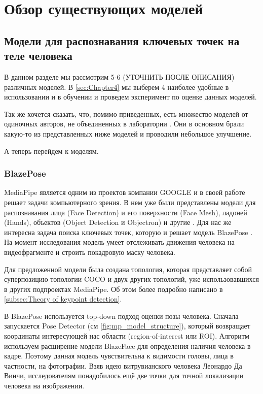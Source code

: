 \section{Обзор существующих моделей}
\label{sec:Chapter2} 

\subsection{Модели для распознавания ключевых точек на теле человека}

В данном разделе мы рассмотрим 5-6 (УТОЧНИТЬ ПОСЛЕ ОПИСАНИЯ) различных моделей. В \autoref{sec:Chapter4} мы выберем 4 наиболее удобные в использовании и в обучении и проведем эксперимент по оценке данных моделей.

Так же хочется сказать, что, помимо приведенных, есть множество моделей от одиночных авторов, не объединенных в лаборатории \cite{pet_recognition, pet_classification}. Они в основном брали какую-то из представленных ниже моделей и проводили небольшое улучшение.

А теперь перейдем к моделям.

\subsubsection{BlazePose}

MediaPipe является одним из проектов компании GOOGLE и в своей работе решает задачи компьютерного зрения. В нем уже были представлены модели для распознавания лица (Face Detection) и его поверхности (Face Mesh), ладоней (Hands), объектов (Object Detection и Objectron) и другие \cite{mediapipe}. Для нас же интересна задача поиска ключевых точек, которую и решает модель BlazePose \cite{BlazePose}. На момент исследования модель умеет отслеживать движения человека на видеофрагменте и строить покадровую маску человека.

Для предложенной модели была создана топология, которая представляет собой суперпозицию топологии COCO и двух других топологий, уже использовавшихся в других подпроектах MediaPipe. Об этом более подробно написано в \autoref{subsec:Theory of keypoint detection}.

\hfill \break
В BlazePose используется top-down подход оценки позы человека. Сначала запускается Pose Detector (см \autoref{fig:mp_model_structure}), который возвращает координаты интересующей нас области (region-of-interest или ROI). Алгоритм используем расширение модели BlazeFace для определения наличия человека в кадре. Поэтому данная модель чувствительна к видимости головы, лица в частности, на фотографии. Взяв идею витрувианского человека Леонардо Да Винчи, исследователям понадобилось ещё две точки для точной локализации человека на изображении.

